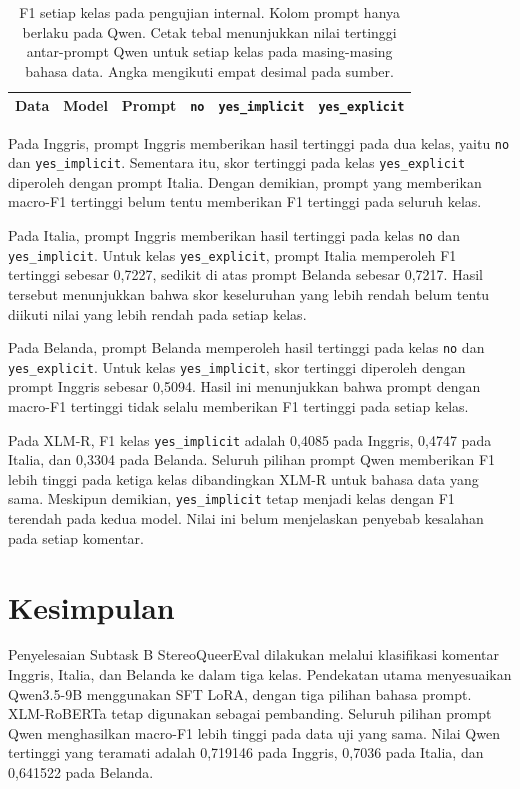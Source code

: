 \documentclass[11pt]{article}
\begin{document}
\begin{table}[t]
\centering
\begin{tabular}{lllrrr}
\toprule
Data & Model & Prompt & \texttt{no} & \texttt{yes\_implicit} & \texttt{yes\_explicit} \\
\midrule

\end{tabular}
\caption{F1 setiap kelas pada pengujian internal. Kolom prompt hanya berlaku pada Qwen. Cetak tebal menunjukkan nilai tertinggi antar-prompt Qwen untuk setiap kelas pada masing-masing bahasa data. Angka mengikuti empat desimal pada sumber.}
\label{tab:classes}
\end{table}

Pada Inggris, prompt Inggris memberikan hasil tertinggi pada dua kelas, yaitu \texttt{no} dan \nolinkurl{yes_implicit}. Sementara itu, skor tertinggi pada kelas \nolinkurl{yes_explicit} diperoleh dengan prompt Italia. Dengan demikian, prompt yang memberikan macro-F1 tertinggi belum tentu memberikan F1 tertinggi pada seluruh kelas.

Pada Italia, prompt Inggris memberikan hasil tertinggi pada kelas \texttt{no} dan \nolinkurl{yes_implicit}. Untuk kelas \nolinkurl{yes_explicit}, prompt Italia memperoleh F1 tertinggi sebesar 0,7227, sedikit di atas prompt Belanda sebesar 0,7217. Hasil tersebut menunjukkan bahwa skor keseluruhan yang lebih rendah belum tentu diikuti nilai yang lebih rendah pada setiap kelas.

Pada Belanda, prompt Belanda memperoleh hasil tertinggi pada kelas \texttt{no} dan \texttt{yes\_explicit}. Untuk kelas \texttt{yes\_implicit}, skor tertinggi diperoleh dengan prompt Inggris sebesar 0,5094. Hasil ini menunjukkan bahwa prompt dengan macro-F1 tertinggi tidak selalu memberikan F1 tertinggi pada setiap kelas.

Pada XLM-R, F1 kelas \texttt{yes\_implicit} adalah 0,4085 pada Inggris, 0,4747 pada Italia, dan 0,3304 pada Belanda. Seluruh pilihan prompt Qwen memberikan F1 lebih tinggi pada ketiga kelas dibandingkan XLM-R untuk bahasa data yang sama. Meskipun demikian, \texttt{yes\_implicit} tetap menjadi kelas dengan F1 terendah pada kedua model. Nilai ini belum menjelaskan penyebab kesalahan pada setiap komentar.

\section{Kesimpulan}
Penyelesaian Subtask B StereoQueerEval dilakukan melalui klasifikasi komentar Inggris, Italia, dan Belanda ke dalam tiga kelas. Pendekatan utama menyesuaikan Qwen3.5-9B menggunakan SFT LoRA, dengan tiga pilihan bahasa prompt. XLM-RoBERTa tetap digunakan sebagai pembanding. Seluruh pilihan prompt Qwen menghasilkan macro-F1 lebih tinggi pada data uji yang sama. Nilai Qwen tertinggi yang teramati adalah 0,719146 pada Inggris, 0,7036 pada Italia, dan 0,641522 pada Belanda.
\end{document}
